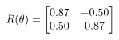 \documentclass[preview]{standalone}
\begin{document}
\begin{align*}
\special{dvisvgm:raw <g id='unique000'>}R(\theta) = \begin{bmatrix}0.87 & -0.50\\0.50 & 0.87\end{bmatrix}\special{dvisvgm:raw </g>}
\end{align*}
\end{document}
